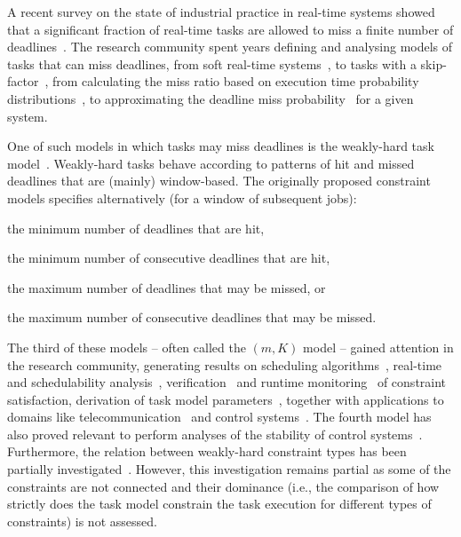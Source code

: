 A recent survey on the state of industrial practice in real-time systems showed that a significant fraction of real-time tasks are allowed to miss a finite number of deadlines~\cite{Akesson:2020}.
%
The research community spent years defining and analysing models of tasks that can miss deadlines, from soft real-time systems~\cite{Buttazzo:2005}, to tasks with a skip-factor~\cite{Koren:1995}, from calculating the miss ratio based on execution time probability distributions~\cite{Manolache:2004}, to approximating the deadline miss probability~\cite{vonDerBruggen:2018, Bozhko:2021, vonderBrueggen:2021} for a given system.

One of such models in which tasks may miss deadlines is the weakly-hard task model~\cite{Bernat:2001}. 
Weakly-hard tasks behave according to patterns of hit and missed deadlines that are (mainly) window-based.
The originally proposed constraint models specifies alternatively (for a window of subsequent jobs):
\begin{enumerate*}[label=(\roman*)]
    \item the minimum number of deadlines that are hit,
    \item the minimum number of consecutive deadlines that are hit,
    \item the maximum number of deadlines that may be missed, or
    \item the maximum number of consecutive deadlines that may be missed.
\end{enumerate*}
The third of these models -- often called the $(m,K)$ model -- gained attention in the research community, generating results on scheduling algorithms~\cite{Hamdaoui:1995}, real-time and schedulability analysis~\cite{Sun:2017, Pazzaglia:2021b, Hammadeh:2017}, verification~\cite{Huang:2019b, Behrouzian:2020} and runtime monitoring~\cite{Wu:2020} of constraint satisfaction, derivation of task model parameters~\cite{Xu:2015}, together with applications to domains like telecommunication~\cite{Ahrendts:2018, Huang:2019a} and control systems~\cite{Ramanathan:1999, Pazzaglia:2018, Vreman:2021, Pazzaglia:2021}. 
The fourth model has also proved relevant to perform analyses of the stability of control systems~\cite{Maggio:2020}. 
Furthermore, the relation between weakly-hard constraint types has been partially investigated~\cite{Tu:2007, Wu:2020}.
However, this investigation remains partial as some of the constraints are not connected and their dominance (i.e., the comparison of how strictly does the task model constrain the task execution for different types of constraints) is not assessed.

